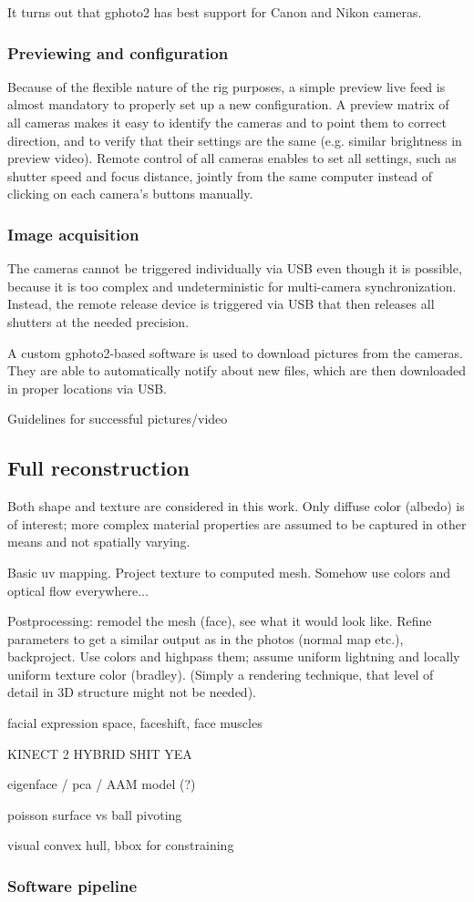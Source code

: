 It turns out that gphoto2 has best support for Canon and Nikon cameras.

\subsubsection{Previewing and configuration}

Because of the flexible nature of the rig purposes, a simple preview live feed is almost mandatory to properly set up a new configuration.
A preview matrix of all cameras makes it easy to identify the cameras and to point them to correct direction, and to verify that their settings are the same (e.g. similar brightness in preview video).
Remote control of all cameras enables to set all settings, such as shutter speed and focus distance, jointly from the same computer instead of clicking on each camera's buttons manually.

\subsubsection{Image acquisition}

The cameras cannot be triggered individually via USB even though it is possible, because it is too complex and undeterministic for multi-camera synchronization.
Instead, the remote release device is triggered via USB that then releases all shutters at the needed precision.

A custom gphoto2-based software is used to download pictures from the cameras. They are able to automatically notify about new files, which are then downloaded in proper locations via USB.

Guidelines for successful pictures/video

\subsection{Full reconstruction}

Both shape and texture are considered in this work. Only diffuse color (albedo) is of interest; more complex material properties are assumed to be captured in other means and not spatially varying.

Basic uv mapping. Project texture to computed mesh. Somehow use colors and optical flow everywhere...

Postprocessing: remodel the mesh (face), see what it would look like. Refine parameters to get a similar output as in the photos (normal map etc.), backproject. Use colors and highpass them; assume uniform lightning and locally uniform texture color (bradley). (Simply a rendering technique, that level of detail in 3D structure might not be needed).

facial expression space, faceshift, face muscles

KINECT 2 HYBRID SHIT YEA

eigenface / pca / AAM model (?)

poisson surface vs ball pivoting

visual convex hull, bbox for constraining

\subsubsection{Software pipeline}
